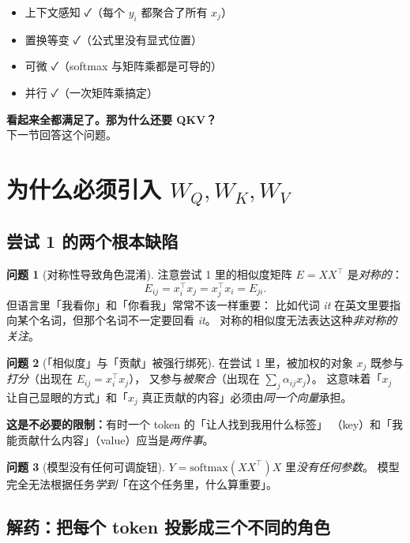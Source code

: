 \documentclass[11pt,a4paper]{ctexart}
\theoremstyle{definition}
\newtheorem{problem}{问题}
\theoremstyle{remark}
\newcommand{\softmax}{\mathrm{softmax}}
\begin{document}
\begin{itemize}
  \item 上下文感知 ✓（每个 $y_i$ 都聚合了所有 $x_j$）
  \item 置换等变 ✓（公式里没有显式位置）
  \item 可微 ✓（softmax 与矩阵乘都是可导的）
  \item 并行 ✓（一次矩阵乘搞定）
\end{itemize}

\textbf{看起来全都满足了。那为什么还要 QKV？}\\
下一节回答这个问题。

\section{为什么必须引入 $W_Q, W_K, W_V$}

\subsection{尝试 1 的两个根本缺陷}

\begin{problem}[对称性导致角色混淆]
注意尝试 1 里的相似度矩阵 $E = X X^\top$ 是\emph{对称的}：
\[
  E_{ij} = x_i^\top x_j = x_j^\top x_i = E_{ji}.
\]
但语言里「我看你」和「你看我」常常不该一样重要：
比如代词 \emph{it} 在英文里要指向某个名词，但那个名词不一定要回看 \emph{it}。
对称的相似度无法表达这种\emph{非对称的关注}。
\end{problem}

\begin{problem}[「相似度」与「贡献」被强行绑死]
在尝试 1 里，被加权的对象 $x_j$ 既参与\emph{打分}（出现在 $E_{ij} = x_i^\top x_j$），
又参与\emph{被聚合}（出现在 $\sum_j \alpha_{ij} x_j$）。
这意味着「$x_j$ 让自己显眼的方式」和「$x_j$ 真正贡献的内容」必须由\emph{同一个向量}承担。

\textbf{这是不必要的限制：}有时一个 token 的「让人找到我用什么标签」
（key）和「我能贡献什么内容」（value）应当是\emph{两件事}。
\end{problem}

\begin{problem}[模型没有任何可调旋钮]
$Y = \softmax(XX^\top) X$ 里\emph{没有任何参数}。
模型完全无法根据任务\emph{学到}「在这个任务里，什么算重要」。
\end{problem}

\subsection{解药：把每个 token 投影成三个不同的角色}
\end{document}
